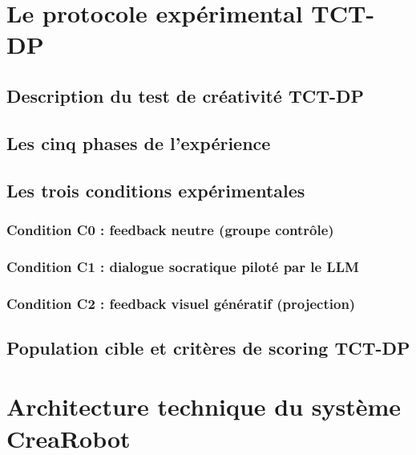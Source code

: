 \documentclass[11pt]{article}
\begin{document}
\newpage

\section{Le protocole expérimental TCT-DP}
\label{sec:protocole}

\subsection{Description du test de créativité TCT-DP}
\subsection{Les cinq phases de l'expérience}
\subsection{Les trois conditions expérimentales}
\subsubsection{Condition C0 : feedback neutre (groupe contrôle)}
\subsubsection{Condition C1 : dialogue socratique piloté par le LLM}
\subsubsection{Condition C2 : feedback visuel génératif (projection)}
\subsection{Population cible et critères de scoring TCT-DP}

\newpage

\section{Architecture technique du système CreaRobot}
\label{sec:architecture}
\end{document}
